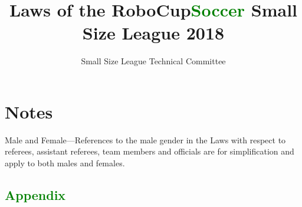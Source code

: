 \documentclass[12pt]{article}
\newif\ifdiff
\newcommand{\added}[1]{\textcolor{green}{#1}}
\newcommand{\removed}[1]{\textcolor{red}{#1}}
\newcommand{\added}[1]{#1}
\newcommand{\removed}[1]{}
\begin{document}
\setcounter{page}{1}

\title{Laws of the RoboCup\added{Soccer} Small Size League 2018}
\author{Small Size League Technical Committee}

\maketitle

\vfill

\tableofcontents

\section*{Notes}
Male and Female---References to the male gender in the Laws with respect to referees, assistant referees, team members and officials are for simplification and apply to both males and females.

\ifdiff
\added{Text added from the previous year is shown in green.}

\removed{Text removed from the previous year is shown in red.}
\fi

\thispagestyle{fancy}

\clearpage

\cfoot{\thepage}
\setcounter{page}{1}



















\newpage
\appendix
\added{\section*{Appendix}}



\end{document}

